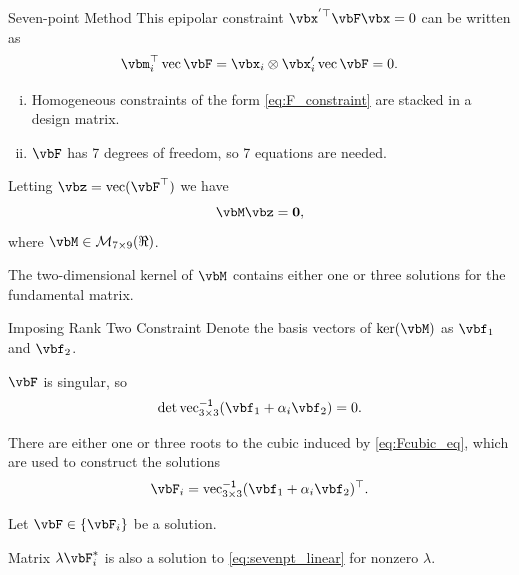 \documentclass[8pt,aspectratio=169]{beamer}
\begin{document}
\begin{frame}[fragile]{Seven-point Method}
  This epipolar constraint $\vbx^{'\T} \vbF \vbx=0$ can be written as
  \[
    \label{eq:F_constraint}
    \vbm^\T_i \vect \vbF = \vbx_i \otimes \vbx'_i  \vect \vbF = 0.
  \]

  \smallskip
  
  \begin{enumerate}[(i)]
  \item Homogeneous constraints of the form \eqref{eq:F_constraint} are
    stacked in a design matrix.
  \item $\vbF$ has 7 degrees of freedom, so 7 equations are needed.
  \end{enumerate}

  \smallskip
  
  Letting $\vbz = \operatorname{vec}(\vbF^{\T})$ we have
  \[
    \label{eq:sevenpt_linear}
    \vbM\vbz = \vbzero,
  \]
  where $\vbM \in \mathcal{M}_{7 \times 9}(\Re)$.

  \begin{result}
    The two-dimensional kernel of $\vbM$ contains either one or three
    solutions for the fundamental matrix.
  \end{result}
\end{frame}
 
\begin{frame}[fragile]{Imposing Rank Two Constraint}
  Denote the basis vectors of $\ker(\vbM)$ as $\vbf_1$ and $\vbf_2$.

  \smallskip
  
  $\vbF$ is singular, so
  \begin{equation}
    \label{eq:Fcubic_eq}
    \det \operatorname{vec}^{\inv}_{3\times3} (\vbf_1+\alpha_i \vbf_2) = 0.
  \end{equation}

  \smallskip
  
  There are either one or three roots to the cubic induced by
  \eqref{eq:Fcubic_eq}, which are used to construct the solutions
  \begin{equation}
    \label{eq:estimateF}
    \vbF_i = \operatorname{vec}^{\inv}_{3\times3} (\vbf_1+\alpha_i \vbf_2)^{\T}.
  \end{equation}

  Let $\vbF \in \{ \vbF_i \}$ be a solution.
  \medskip

  Matrix $\lambda \vbF^{*}_i$ is also a solution to \eqref{eq:sevenpt_linear} for nonzero $\lambda$.
\end{frame}
\end{document}
